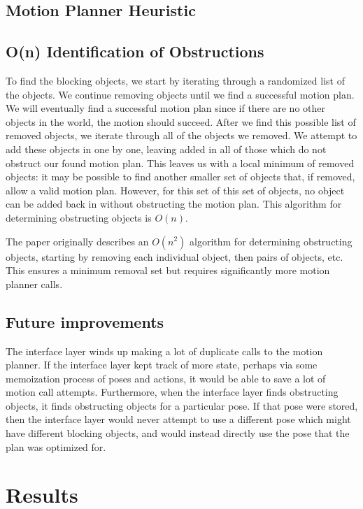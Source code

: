 \documentclass[12pt]{article}
\begin{document}
\subsection{Motion Planner Heuristic}

\subsection{O(n) Identification of Obstructions}

To find the blocking objects, we start by iterating through a randomized list of the objects.  
We continue removing objects until we find a successful motion plan.  
We will eventually find a successful motion plan since if there are no other objects in the world, the motion should succeed.  
After we find this possible list of removed objects, we iterate through all of the objects we removed.  
We attempt to add these objects in one by one, leaving added in all of those which do not obstruct our found motion plan.  
This leaves us with a local minimum of removed objects: it may be possible to find another smaller set of objects that, if removed, allow a valid motion plan.  
However, for this set of this set of objects, no object can be added back in without obstructing the motion plan.
This algorithm for determining obstructing objects is $O(n)$.

The paper originally describes an $O(n^2)$ algorithm for determining obstructing objects, starting by removing each individual object, then pairs of objects, etc.  
This ensures a minimum removal set but requires significantly more motion planner calls.

\subsection{Future improvements}

The interface layer winds up making a lot of duplicate calls to the motion planner.
If the interface layer kept track of more state, perhaps via some memoization process of poses and actions, it would be able to save a lot of motion call attempts.
Furthermore, when the interface layer finds obstructing objects, it finds obstructing objects for a particular pose.  
If that pose were stored, then the interface layer would never attempt to use a different pose which might have different blocking objects, and would instead directly use the pose that the plan was optimized for.


\section{Results}
\end{document}
